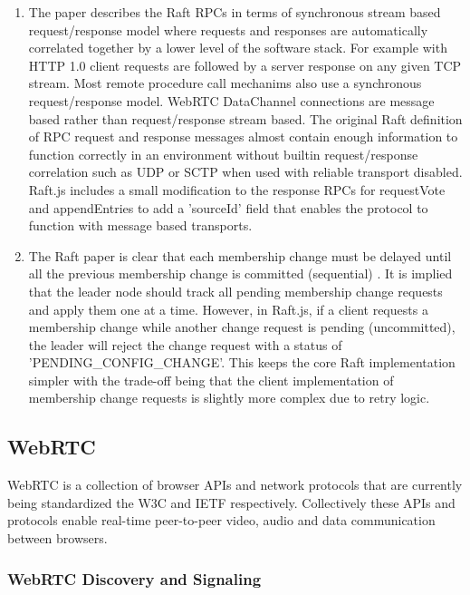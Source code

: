 \documentclass[9pt]{extarticle}
\begin{document}
\begin{multicols}{2}
\begin{enumerate}
\item The paper describes the Raft RPCs in terms of synchronous stream
    based request/response model where requests and responses are
    automatically correlated together by a lower level of the software
    stack. For example with HTTP 1.0 \cite{http:rfc1945} client
    requests are followed by a server response on any given TCP
    stream. Most remote procedure call mechanims also use
    a synchronous request/response model. %
    WebRTC DataChannel connections are message based rather than
    request/response stream based. %
    The original Raft definition of RPC request and response messages
    almost contain enough information to function correctly in an
    environment without builtin request/response correlation such as
    UDP or SCTP when used with reliable transport disabled. %
    Raft.js includes a small modification to the response RPCs for
    requestVote and appendEntries to add a 'sourceId' field that
    enables the protocol to function with message based transports.
\item The Raft paper is clear that each membership change must be
    delayed until all the previous membership change is committed
    (sequential) \cite[Section~4.1]{raft_thesis:ongaro14}. It is
    implied that the leader node should track all pending membership
    change requests and apply them one at a time.  However, in
    Raft.js, if a client requests a membership change while another
    change request is pending (uncommitted), the leader will reject
    the change request with a status of 'PENDING\_CONFIG\_CHANGE'.
    This keeps the core Raft implementation simpler with the trade-off
    being that the client implementation of membership change requests
    is slightly more complex due to retry logic.
\end{enumerate}

\subsection{WebRTC}

WebRTC is a collection of browser APIs \cite{webrtc:feb2015} and
network protocols \cite{draft-rtcweb-overview} that are currently
being standardized the W3C and IETF respectively. Collectively these
APIs and protocols enable real-time peer-to-peer video, audio and data
communication between browsers.

\subsubsection{WebRTC Discovery and Signaling}


\end{multicols}
\end{document}
